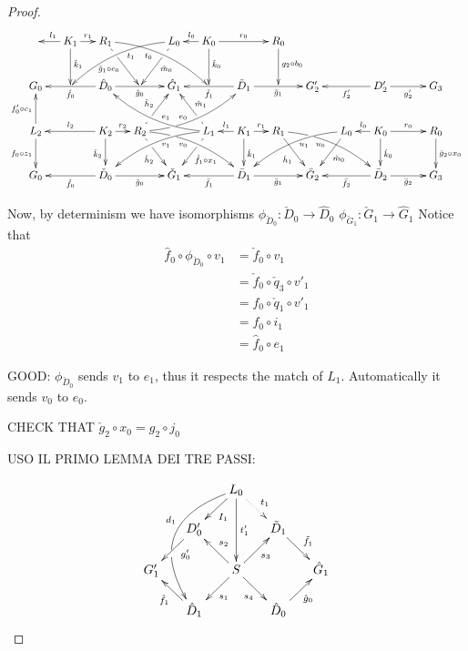\documentclass[a4paper,UKenglish,cleveref,pdftex,thm-restate,numberwithinsect,anonymous]{lipics}
\def\G{\textbf {\textup{G}}}
\begin{document}
\begin{proof}
	
	\[\xymatrix@C=13pt@R=25pt{
		& K_1 \ar[d]^{\hat{k}_1}\ar[l]_{l_1} \ar[r]^{r_1} & R_1 \ar@/^.35cm/[drrr]_(.4){t_0} \ar[dr]|(.28)\hole_{\hat{g}_1\circ c_0}   && L_0  \ar[dl]|(.28)\hole^{\hat{m}_0} \ar@/_.35cm/[dlll]^(.4){t_1}& K_0 \ar[d]^{\hat{k}_0}\ar[l]_{l_0} \ar[rr]^{r_0} && R_0 \ar[d]^{g_2\circ b_0} \\G_0 && \ar[ll]^{\hat{f}_0} \hat{D}_0 \ar[rr]_{\hat{g}_0}&& \hat{G}_1  && \ar[ll]^{\tilde{f}_1} \tilde{D}_1 \ar[rr]_{\tilde{g}_1}&& G'_2 && \ar[ll]^{f'_2} D'_2 \ar[rr]_{g'_2}&& G_3 \\
		L_2\ar[d]_{f_0\circ z_1} \ar[u]^{f'_0\circ c_1}&& K_2 \ar[d]_{\mathring{k}_2}\ar[ll]_{l_2} \ar[r]^{r_2} & R_2 \ar@/_.35cm/[urrr]^(.4){e_0}|(.285)\hole \ar[ur]|(.28)\hole^{\hat{h}_2} \ar@/^.35cm/[drrr]_(.4){v_0}|(.285)\hole \ar[dr]|(.28)\hole_{\mathring{h}_2} && L_1 \ar@/^.35cm/[ulll]_(.4){e_1} \ar[ul]|(.28)\hole_{\hat{m}_1} \ar@/_.35cm/[dlll]^(.4){v_1} \ar[dl]|(.28)\hole^{\mathring{f}_1 \circ x_1}& K_1 \ar[d]^{\mathring{k}_1}\ar[l]_{l_1} \ar[r]^{r_1} & R_1 \ar@/^.35cm/[drrr]_(.4){u_0}|(.285)\hole\ar[dr]_{\check{h}_1}   && L_0 \ar@/_.35cm/[dlll]^(.4){u_1} \ar[dl]^{\mathring{m}_0}& K_0 \ar[d]^{\mathring{k}_0}\ar[l]_{l_0} \ar[rr]^{r_0} && R_0\ar[d]^{\check{g}_2\circ x_0} \\G_0 && \ar[ll]^{\check{f}_0} \check{D}_0 \ar[rr]_{\check{g}_0}&& \check{G}_1  && \ar[ll]^{\bar{f}_1} \bar{D}_1 \ar[rr]_{\bar{g}_1}&& \bar{G}_2 && \ar[ll]^{\bar{f}_2} \bar{D}_2 \ar[rr]_{\bar{g}_2}&& G_3 }\]
	
	Now, by determinism we have isomorphisms $\phi_{\check{D}_0}\colon \check{D}_0\to \hat{D}_0$ $\phi_{\check{G}_1}\colon \check{G}_1\to \hat{G}_1$
	Notice that
	\begin{align*}
		\hat{f}_0\circ \phi_{\check{D}_0}\circ v_1 & = \check{f}_0\circ v_1 \\&=\check{f}_0\circ \check{q}_3\circ v'_1\\&=f_0\circ \check{q}_1\circ v'_1\\&=f_0\circ i_1\\&=\hat{f}_0\circ e_1
	\end{align*}
	
	GOOD: $\phi_{\check{D}_0}$ sends $v_1$ to $e_1$, thus it respects the match of $L_1$. Automatically it sends $v_0$ to $e_0$.
	
	CHECK THAT $\check{g}_2\circ x_0=g_2\circ j_0$
	
	USO IL PRIMO LEMMA DEI TRE PASSI:
	

	
	
	
	\[\xymatrix@R=15pt@C=15pt{&&L_ 0\ar[dl]^{I_1} \ar@/_1.2cm/[dddl]_(.4){d_1}|(.63)\hole\ar[dd]^{t'_1} \ar@{.>}[dr]^{t_1}\\&D'_0 \ar[dl]^(.4){g'_0}&&\tilde{D}_1 \ar[dr]^{\tilde{f}_1}\\G'_1 && S\ar[dr]_{s_4} \ar[ur]_{s_3}\ar[dl]^{s_1} \ar[ul]_{s_2}&&\hat{G}_1\\& \hat{D}_1 \ar[ul]^{\hat{f}_1}&&\hat{D}_0 \ar[ur]_{\hat{g}_0}}\]
\end{proof}
\end{document}
